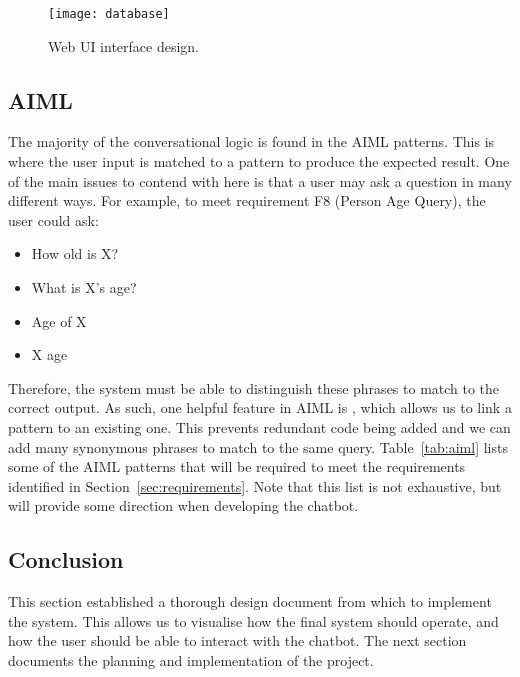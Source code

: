 \begin{figure}[h]
	\begin{center}
		\texttt{[image: database]}
	\end{center}
	\caption{Web UI interface design.}
	\label{fig:dbdesign}
\end{figure}

\subsection{AIML}
The majority of the conversational logic is found in the AIML patterns. This is where the user input is matched to a pattern to produce the expected result. One of the main issues to contend with here is that a user may ask a question in many different ways. For example, to meet requirement F8 (Person Age Query), the user could ask:
\begin{itemize}
	\setlength\itemsep{0em}
	\item How old is X?
	\item What is X's age?
	\item Age of X
	\item X age
\end{itemize}

Therefore, the system must be able to distinguish these phrases to match to the correct output. As such, one helpful feature in AIML is , which allows us to link a pattern to an existing one. This prevents redundant code being added and we can add many synonymous phrases to match to the same query. Table~\ref{tab:aiml} lists some of the AIML patterns that will be required to meet the requirements identified in Section~\ref{sec:requirements}. Note that this list is not exhaustive, but will provide some direction when developing the chatbot.

\subsection{Conclusion}
This section established a thorough design document from which to implement the system. This allows us to visualise how the final system should operate, and how the user should be able to interact with the chatbot. The next section documents the planning and implementation of the project.

